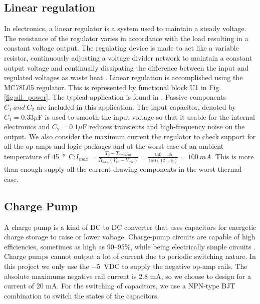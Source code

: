 \subsection{Linear regulation}
In electronics, a linear regulator is a system used to maintain a steady voltage. The resistance of the regulator varies in accordance with the load resulting in a constant voltage output. The regulating device is made to act like a variable resistor, continuously adjusting a voltage divider network to maintain a constant output voltage and continually dissipating the difference between the input and regulated voltages as waste heat \cite{regulators_theory}. Linear regulation is accomplished using the MC78L05 regulator. This is represented by functional block U1 in Fig. \ref{fig:all_power}. The typical application is found in \cite{LM7805}. Passive components $C_1 \ and \ C_2$ are included in this application.
The input capacitor, denoted by $C_{1} = 0.33 \mu$F is used to smooth the input voltage so that it usable for the internal electronics and $C_{2} = 0.1 \mu$F reduces transients and high-frequency noise on the output.
We also consider the maximum current the regulator to check support for all the op-amps and logic packages and  at the worst case of an ambient temperature of \SI{45}{\degree C}:$ I_{max} = \frac{T_j-T_{ambient}}{R_{\theta JA}(V_{in}-V_{out})}=\frac{150-45}{150(12-5)}=100 \ mA$. This is more than enough supply all the current-drawing components in the worst thermal case.

\subsection{Charge Pump} \label{sec:Charge_Pump}
A charge pump is a kind of DC to DC converter that uses capacitors for energetic charge storage to raise or lower voltage. Charge-pump circuits are capable of high efficiencies, sometimes as high as 90–95\%, while being electrically simple circuits \cite{CHPump}.
Charge pumps cannot output a lot of current due to periodic switching nature. In this project we only use the \SI{-5}{VDC} to supply the negative op-amp rails. The absolute maximums negative rail current is 2.8 mA, so we choose to design for a current of 20 mA.
For the switching of capacitors, we use a NPN-type BJT combination to switch the states of the capacitors.

